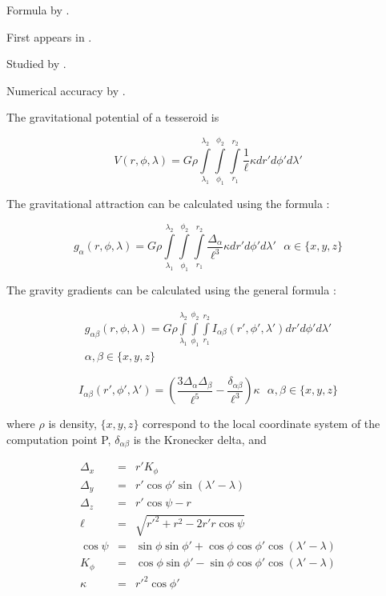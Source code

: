 \documentclass[paper,twocolumn,twoside]{geophysics}
\begin{document}
Formula by \citet{Grombein2013}.

First appears in \citet{Asgharzadeh2007}.

Studied by \citet{Wild-Pfeiffer2008}.

Numerical accuracy by \citet{Ku1977}.

The gravitational potential of a tesseroid is

\begin{equation}
    V(r,\phi,\lambda) = G \rho
        \int\limits_{\lambda_1}^{\lambda_2}
        \int\limits_{\phi_1}^{\phi_2}
        \int\limits_{r_1}^{r_2}
        \frac{1}{\ell} \kappa  dr' d\phi' d\lambda'
\end{equation}

The gravitational attraction
can be calculated using the formula
\citep{Grombein2013}:

\begin{equation}
    g_{\alpha}(r,\phi,\lambda) = G \rho
        \int\limits_{\lambda_1}^{\lambda_2}
        \int\limits_{\phi_1}^{\phi_2}
        \int\limits_{r_1}^{r_2}
        \frac{\Delta_{\alpha}}{\ell^3} \kappa dr' d\phi' d\lambda'
        \ \ \ \alpha \in \{x,y,z\}
\end{equation}

The gravity gradients can be calculated
using the general formula
\citep{Grombein2013}:

\begin{multline}
    g_{\alpha\beta}(r,\phi,\lambda) = G \rho
        \int\limits_{\lambda_1}^{\lambda_2}
        \int\limits_{\phi_1}^{\phi_2}
        \int\limits_{r_1}^{r_2}
        I_{\alpha\beta}({r'}, {\phi'}, {\lambda'})
        dr' d\phi' d\lambda'
        \\
        \alpha,\beta \in \{x,y,z\}
\end{multline}

\begin{equation}
    I_{\alpha\beta}({r'}, {\phi'}, {\lambda'}) =
        \left(
            \frac{3\Delta_{\alpha} \Delta_{\beta}}{\ell^5} -
            \frac{\delta_{\alpha\beta}}{\ell^3}
        \right)
        \kappa \ \ \ \alpha,\beta \in \{x,y,z\}
\end{equation}

where $\rho$ is density,
$\{x, y, z\}$ correspond to the local coordinate system
of the computation point P,
$\delta_{\alpha\beta}$ is the Kronecker delta, and

\begin{eqnarray}
    \Delta_x &=& r' K_{\phi} \\
    \Delta_y &=& r' \cos \phi' \sin(\lambda' - \lambda) \\
    \Delta_z &=& r' \cos \psi - r\\
    \ell &=& \sqrt{r'^2 + r^2 - 2 r' r \cos \psi} \\
    \cos\psi &=& \sin\phi\sin\phi' + \cos\phi\cos\phi'
                 \cos(\lambda' - \lambda) \\
    K_{\phi} &=& \cos\phi\sin\phi' - \sin\phi\cos\phi'
                 \cos(\lambda' - \lambda)\\
    \kappa &=& {r'}^2 \cos \phi'
\end{eqnarray}
\end{document}
